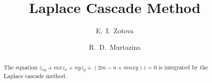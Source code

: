 \begin{englishtitle} %
\title{Laplace Cascade Method}
\author{E.~I.~Zotova
  \and
  R.~D.~Murtazina
 }

\maketitle

\begin{abstract}
The equation $z_{xy}+mxz_{x}+nyz_{y}+(2m-n+mnxy)z=0$ is integrated by the Laplace cascade method.

\end{abstract}
\end{englishtitle}

\iffalse
%
%

